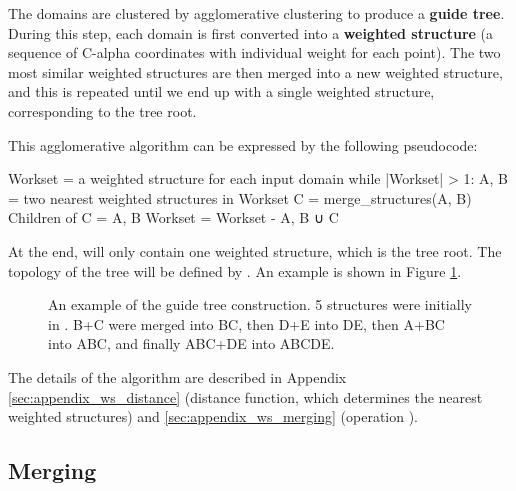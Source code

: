 \documentclass{article}
\begin{document}
The domains are clustered by agglomerative clustering to produce a \textbf{guide
tree}. During this step, each domain is first converted into a
\textbf{weighted structure} (a sequence of C-alpha coordinates with
individual weight for each point). The two most similar weighted
structures are then merged into a new weighted structure, and this is
repeated until we end up with a single weighted structure, corresponding
to the tree root.

This agglomerative algorithm can be expressed by the following
pseudocode:

\begin{codeblock}
    Workset = { a weighted structure for each input domain }  
    while |Workset| > 1:  
        A, B = two nearest weighted structures in Workset
        C = merge_structures(A, B)  
        Children of C = {A, B}
        Workset = Workset - {A, B} ∪ {C}
\end{codeblock}

At the end,  will only contain one weighted structure,
which is the tree root. The topology of the tree will be defined by
. An example is shown in Figure \ref{fig:guide_tree}.

\begin{figure}[h!]
  \caption{An example of the guide tree construction. 5 structures were initially in .
  B+C were merged into BC, then D+E into DE, then A+BC into ABC, and finally ABC+DE into ABCDE.}
  \label{fig:guide_tree}
\end{figure}

The details of the algorithm are described in Appendix \ref{sec:appendix_ws_distance} 
(distance function, which determines the nearest weighted structures) 
and \ref{sec:appendix_ws_merging} (operation ).



\subsection{Merging}
\label{sec:merging}
\end{document}
